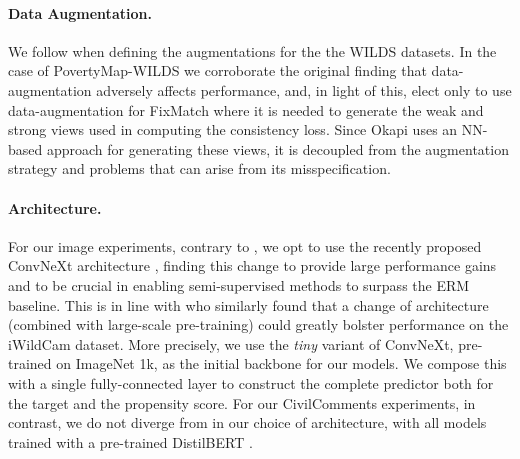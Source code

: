 \paragraph{Data Augmentation.} We follow \cite{SagWeiLeeGaoetal22} when defining the augmentations
for the the WILDS datasets.
%
In the case of PovertyMap-WILDS we corroborate the original finding that data-augmentation
adversely affects performance, and, in light of this, elect only to use data-augmentation for
FixMatch where it is needed to generate the weak and strong views used in computing the consistency
loss.
%
Since Okapi uses an NN-based approach for generating these views, it is decoupled from the
augmentation strategy and problems that can arise from its misspecification.

\paragraph{Architecture.} For our image experiments, contrary to \cite{SagWeiLeeGaoetal22}, we opt
to use the recently proposed ConvNeXt architecture \citep{liu2022convnet}, finding this change to
provide large performance gains and to be crucial in enabling semi-supervised methods to surpass
the ERM baseline.
%
This is in line with \cite{kim2022broad} who similarly found that a change of architecture
(combined with large-scale pre-training) could greatly bolster performance on the iWildCam dataset.
%
More precisely, we use the \emph{tiny} variant of ConvNeXt, pre-trained on ImageNet 1k, as the
initial backbone for our models. We compose this with a single fully-connected layer to construct
the complete predictor both for the target and the propensity score. For our CivilComments
experiments, in contrast, we do not diverge from \cite{SagWeiLeeGaoetal22} in our choice of
architecture, with all models trained with a pre-trained DistilBERT \citep{sanh2019distilbert}.

